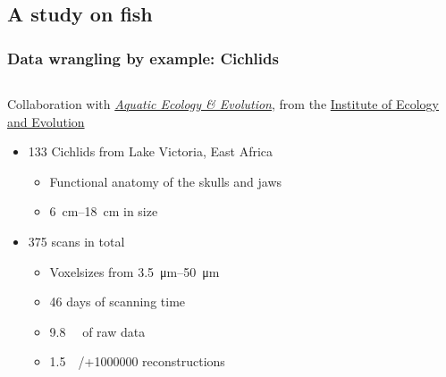 \subsection{A study on fish}
\begin{frame}
	\frametitle{Data wrangling by example: Cichlids}
	\begin{columns}
		\begin{column}{0.5\linewidth}
			Collaboration with \href{https://www.aqua.iee.unibe.ch/}{\emph{Aquatic Ecology \& Evolution}}, from the \href{https://www.iee.unibe.ch/}{Institute of Ecology and Evolution}~\cite{Haberthuer2023}
			\begin{itemize}
				\item 133 Cichlids from Lake Victoria, East Africa
				\begin{itemize}
					\item Functional anatomy of the skulls and jaws
					\item \qtyrange{6}{18}{\centi\meter} in size
				\end{itemize}
				\item 375 scans in total
				\begin{itemize}
					\item Voxelsizes from \qtyrange{3.5}{50}{\micro\meter}
					\item 46 days of scanning time
					\item \qty{9.8}{\tera\byte} of raw data
					\item \qty{1.5}{\tera\byte}/+\num{1000000} reconstructions
				\end{itemize}
			\end{itemize}
		\end{column}
		\begin{column}{0.5\linewidth}
			\centering%
\end{column}
\end{columns}
\end{frame}
